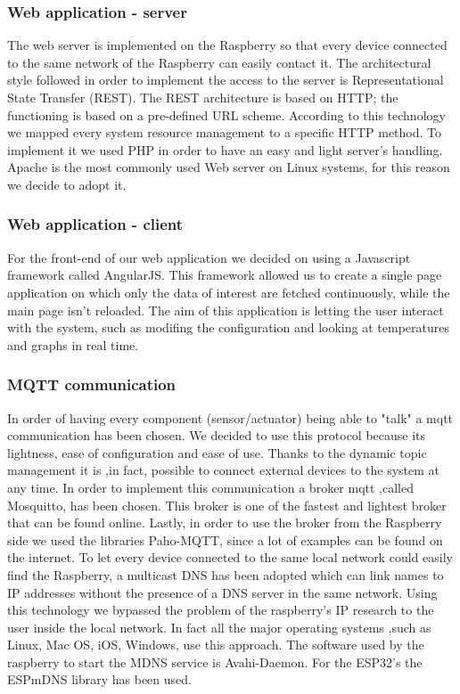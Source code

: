 \documentclass[a4paper]{article}
\begin{document}
        \subsubsection{Web application - server}
        The web server is implemented on the Raspberry so that every device connected to the same network of the Raspberry can easily contact it. The architectural style followed in order to implement the access to the server is Representational State Transfer (REST). The REST architecture is based on HTTP; the functioning is based on a pre-defined URL scheme. According to this technology we mapped every system resource management to a specific HTTP method. To implement it we used PHP in order to have an easy and light server's handling. Apache is the most commonly used Web server on Linux systems, for this reason we decide to adopt it. 
        
        \subsubsection{Web application - client}
        For the front-end of our web application we decided on using a Javascript framework called AngularJS. This framework allowed us to create a single page application on which only the data of interest are fetched continuously, while the main page isn't reloaded. The aim of this application is letting the user interact with the system, such as modifing the configuration and looking at temperatures and graphs in real time. 
        
        \subsubsection{MQTT communication}
        In order of having every component (sensor/actuator) being able to "talk" a mqtt communication has been chosen. We decided to use this protocol because its lightness, ease of configuration and ease of use. Thanks to the dynamic topic management it is ,in fact, possible to connect external devices to the system at any time. In order to implement this communication a broker mqtt ,called Mosquitto, has been chosen. This broker is one of the fastest and lightest broker that can be found online. Lastly, in order to use the broker from the Raspberry side we used the libraries Paho-MQTT, since a lot of examples can be found on the internet. To let every device connected to the same local network could easily find the Raspberry, a multicast DNS has been adopted which can link names to IP addresses without the presence of a DNS server in the same network. Using this technology we bypassed the problem of the raspberry's IP research to the user inside the local network. In fact all the major operating systems ,such as Linux, Mac OS, iOS, Windows, use this approach. The software used by the raspberry to start the MDNS service is Avahi-Daemon. For the ESP32's the ESPmDNS library has been used.
\end{document}
